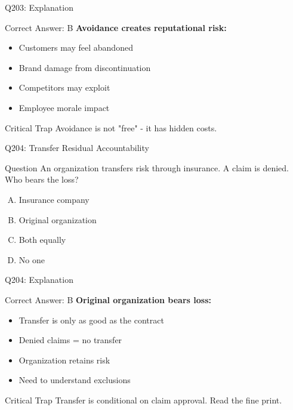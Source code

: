 \documentclass{beamer}
\begin{document}
	\begin{frame}{Q203: Explanation}
		\begin{block}{Correct Answer: B}
			\textbf{Avoidance creates reputational risk:}
			\begin{itemize}
				\item Customers may feel abandoned
				\item Brand damage from discontinuation
				\item Competitors may exploit
				\item Employee morale impact
			\end{itemize}
		\end{block}
		\begin{alertblock}{Critical Trap}
			Avoidance is not "free" - it has hidden costs.
		\end{alertblock}
	\end{frame}
	
	\begin{frame}{Q204: Transfer Residual Accountability}
		\begin{block}{Question}
			An organization transfers risk through insurance. A claim is denied. Who bears the loss?
		\end{block}
		\begin{enumerate}[(A)]
			\item Insurance company
			\item Original organization
			\item Both equally
			\item No one
		\end{enumerate}
	\end{frame}
	
	\begin{frame}{Q204: Explanation}
		\begin{block}{Correct Answer: B}
			\textbf{Original organization bears loss:}
			\begin{itemize}
				\item Transfer is only as good as the contract
				\item Denied claims = no transfer
				\item Organization retains risk
				\item Need to understand exclusions
			\end{itemize}
		\end{block}
		\begin{alertblock}{Critical Trap}
			Transfer is conditional on claim approval.
			Read the fine print.
		\end{alertblock}
	\end{frame}
	
\end{document}
